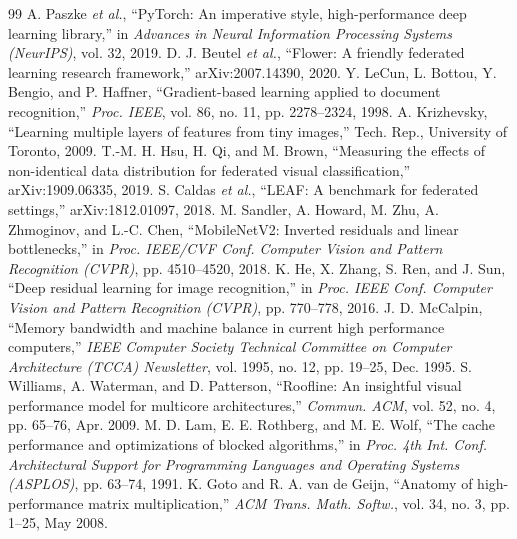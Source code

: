 \documentclass[conference]{IEEEtran}
\begin{document}
\begin{thebibliography}{99}
 A. Paszke \emph{et al.}, ``PyTorch: An imperative style, high-performance deep learning library,'' in \emph{Advances in Neural Information Processing Systems (NeurIPS)}, vol. 32, 2019.
 D. J. Beutel \emph{et al.}, ``Flower: A friendly federated learning research framework,'' arXiv:2007.14390, 2020.
 Y. LeCun, L. Bottou, Y. Bengio, and P. Haffner, ``Gradient-based learning applied to document recognition,'' \emph{Proc. IEEE}, vol. 86, no. 11, pp. 2278--2324, 1998.
 A. Krizhevsky, ``Learning multiple layers of features from tiny images,'' Tech. Rep., University of Toronto, 2009.
 T.-M. H. Hsu, H. Qi, and M. Brown, ``Measuring the effects of non-identical data distribution for federated visual classification,'' arXiv:1909.06335, 2019.
 S. Caldas \emph{et al.}, ``LEAF: A benchmark for federated settings,'' arXiv:1812.01097, 2018.
 M. Sandler, A. Howard, M. Zhu, A. Zhmoginov, and L.-C. Chen, ``MobileNetV2: Inverted residuals and linear bottlenecks,'' in \emph{Proc. IEEE/CVF Conf. Computer Vision and Pattern Recognition (CVPR)}, pp. 4510--4520, 2018.
 K. He, X. Zhang, S. Ren, and J. Sun, ``Deep residual learning for image recognition,'' in \emph{Proc. IEEE Conf. Computer Vision and Pattern Recognition (CVPR)}, pp. 770--778, 2016.
 J. D. McCalpin, ``Memory bandwidth and machine balance in current high performance computers,'' \emph{IEEE Computer Society Technical Committee on Computer Architecture (TCCA) Newsletter}, vol. 1995, no. 12, pp. 19--25, Dec. 1995.
 S. Williams, A. Waterman, and D. Patterson, ``Roofline: An insightful visual performance model for multicore architectures,'' \emph{Commun. ACM}, vol. 52, no. 4, pp. 65--76, Apr. 2009.
 M. D. Lam, E. E. Rothberg, and M. E. Wolf, ``The cache performance and optimizations of blocked algorithms,'' in \emph{Proc. 4th Int. Conf. Architectural Support for Programming Languages and Operating Systems (ASPLOS)}, pp. 63--74, 1991.
 K. Goto and R. A. van de Geijn, ``Anatomy of high-performance matrix multiplication,'' \emph{ACM Trans. Math. Softw.}, vol. 34, no. 3, pp. 1--25, May 2008.
\end{thebibliography}
\end{document}
